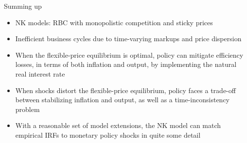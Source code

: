 \documentclass[9pt,xcolor={dvipsnames}]{beamer}
\newcommand{\bit}{\begin{itemize}}
\newcommand{\eit}{\end{itemize}}
\begin{document}
\begin{frame}{Summing up}

\bit
\setlength\itemsep{1.5em}
\item NK models: RBC with monopolistic competition and sticky prices

\item Inefficient business cycles due to time-varying markups and price dispersion

\item When the flexible-price equilibrium is optimal, policy can mitigate efficiency losses, in terms of both inflation and output, by implementing the natural real interest rate

\item When shocks distort the flexible-price equilibrium, policy faces a trade-off between stabilizing inflation and output, as well as a time-inconsistency problem

\item With a reasonable set of model extensions, the NK model can match empirical IRFs to monetary policy shocks in quite some detail

\eit

\end{frame}
\end{document}
